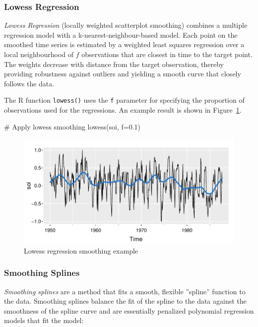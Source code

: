 \subsubsection*{Lowess Regression}

\emph{Lowess Regression} (locally weighted scatterplot smoothing) combines a multiple regression model with a k-nearest-neighbour-based model. Each point on the smoothed time series is estimated by a weighted least squares regression over a local neighbourhood of $f$ observations that are closest in time to the target point. The weights decrease with distance from the target observation, thereby providing robustness against outliers and yielding a smooth curve that closely follows the data. 

The R function \texttt{lowess()} uses the \texttt{f} parameter for specifying the proportion of observations used for the regressions. An example result is shown in Figure~\ref{fig:figure16}.

\begin{Rcode}
# Apply lowess smoothing
lowess(soi, f=0.1)
\end{Rcode}

\begin{figure}
\centering
\includegraphics[width=.75\textwidth]{figure16.pdf}
\caption{Lowess regression smoothing example}
\label{fig:figure16}
\end{figure}

\subsubsection*{Smoothing Splines}

\emph{Smoothing splines} are a method that fits a smooth, flexible ''spline'' function to the data. Smoothing splines balance the fit of the spline to the data against the smoothness of the spline curve and are essentially penalized polynomial regression models that fit the model:


